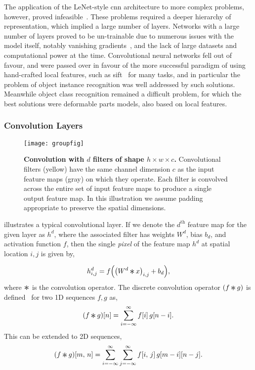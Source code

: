 \documentclass[thesis]{subfiles}
\begin{document}
The application of the LeNet-style \gls{cnn} architecture to more complex problems, however, proved infeasible~\citep{goodfellow2016deep}. These problems required a deeper hierarchy of representation, which implied a large number of layers. Networks with a large number of layers proved to be un-trainable due to numerous issues with the model itself, notably vanishing gradients~\citep{hochreiter1991untersuchungen}, and the lack of large datasets and computational power at the time. Convolutional neural networks fell out of favour, and were passed over in favour of the more successful paradigm of using hand-crafted local features, such as \gls{sift}~\citep{Lowe2004} for many tasks, and in particular the problem of object instance recognition was well addressed by such solutions. Meanwhile object class recognition remained a difficult problem, for which the best solutions were deformable parts models, also based on local features.

\subsubsection{Convolution Layers}
\begin{figure}[tb]
	\centering
	\texttt{[image: groupfig]}
	\caption[Illustration of convolutional layer]{\textbf{Convolution with $d$ filters of shape $h\times w\times c$.} Convolutional filters (yellow) have the same channel dimension $c$ as the input feature maps (gray) on which they operate. Each filter is convolved across the entire set of input feature maps to produce a single output feature map. In this illustration we assume padding appropriate to preserve the spatial dimensions.}\label{fig:convlayer}
\end{figure}
%
 illustrates a typical convolutional layer. If we denote the $d^{\text{th}}$ feature map for the given layer as $h^d$, where the associated filter has weights $W^d$, bias $b_d$, and activation function $f$, then the single \emph{pixel} of the feature map $h^d$ at spatial location $i, j$ is given by,

\begin{equation}
	h^d_{i,j} = f{\left( {\left(W^d \convolution x \right)}_{i,j} + b_d \right)},
\end{equation}
%
where $\convolution$ is the convolution operator. The discrete convolution operator $(f \convolution g)$ is defined~\citep{damelin2011} for two 1D sequences $f, g$ as,
\begin{equation}
	(f \convolution g)[n] = \sum_{i=-\infty}^\infty f[i]\, g[n - i].
\end{equation}
%
This can be extended to 2D sequences,
\begin{equation}
(f \convolution g)[m,\,n] = \sum_{i=-\infty}^\infty \sum_{j=-\infty}^\infty f[i,\,j]\, g[m - i][n - j].
\end{equation}
%
\end{document}
